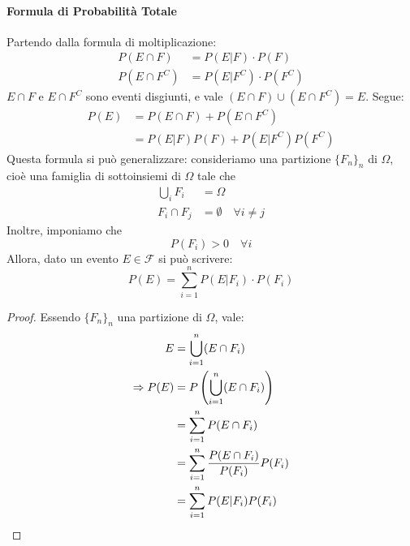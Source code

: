 \documentclass{article}
\theoremstyle{plain}
\theoremstyle{definition}
\theoremstyle{remark}
\begin{document}
\paragraph{Formula di Probabilità Totale} %
\label{par:formula_di_probabilità_totale}
Partendo dalla formula di moltiplicazione:
\begin{align*}
	P(E\cap F)&=P(E|F)\cdot P(F)\\
	P(E\cap F^C)&=P(E|F^C)\cdot P(F^C)
\end{align*}
$E\cap F$ e $E\cap F^C$ sono eventi disgiunti, e vale $(E\cap F)\cup(E\cap F^C)=E$. Segue:
\begin{align*}
	P(E)&=P(E\cap F)+P(E\cap F^C)\\
	&=P(E|F)P(F)+P(E|F^C)P(F^C)
\end{align*}
Questa formula si può generalizzare: consideriamo una partizione $\{F_n\}_n$ di $\Omega$, cioè una famiglia di sottoinsiemi di $\Omega$ tale che
\begin{align*}
	\bigcup_i F_i&=\Omega\\
	F_i\cap F_j&=\emptyset\quad\forall i\neq j
\end{align*}
Inoltre, imponiamo che
\begin{equation*}
	P(F_i)>0\quad\forall i
\end{equation*}
Allora, dato un evento $E\in\mathscr{F}$ si può scrivere:
\begin{equation*}
	P(E)=\sum_{i=1}^n P(E|F_i)\cdot P(F_i)
\end{equation*}
\begin{proof}
	Essendo $\{F_n\}_n$ una partizione di $\Omega$, vale:
	\begin{align*}
		E&=\bigcup_{i=1}^n (E\cap F_i)\\
		\Rightarrow P(E)&=P\left(\bigcup_{i=1}^n (E\cap F_i)\right)\\
		&=\sum_{i=1}^n P(E\cap F_i)\\
		&=\sum_{i=1}^n \frac{P(E\cap F_i)}{P(F_i)}P(F_i)\\
		&=\sum_{i=1}^n P(E|F_i)P(F_i)\qedhere
	\end{align*}
\end{proof}
\end{document}
